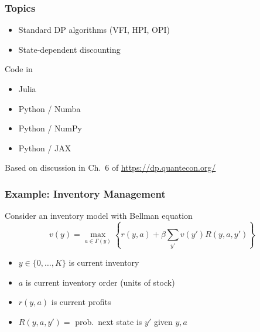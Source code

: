 \documentclass[xcolor=tex,dvipsnames]{beamer}
\subtitle{Lecture 1: Numerical Dynamic Programming}
\begin{document}
\begin{frame}
  \titlepage
\end{frame}


\begin{frame}
    \frametitle{Topics}

    \begin{itemize}
        \item Standard DP algorithms (VFI, HPI, OPI)
            \vspace{0.3em}
        \item State-dependent discounting
            \vspace{0.3em}
    \end{itemize}

    \vspace{0.3em}
    \vspace{0.3em}
    \vspace{0.3em}
    \vspace{0.3em}
    Code in 

    \begin{itemize}
        \item Julia
            \vspace{0.3em}
        \item Python / Numba
            \vspace{0.3em}
        \item Python / NumPy
            \vspace{0.3em}
        \item Python / JAX
    \end{itemize}

    Based on discussion in Ch.\ 6 of \url{https://dp.quantecon.org/}

\end{frame}



\begin{frame}
    \frametitle{Example: Inventory Management}

    Consider an inventory model  with Bellman equation
    \begin{equation*}
        v(y)
        = \max_{a \in \Gamma(y)} \left\{
            r(y, a)
            + \beta
            \sum_{y'} v(y') R(y, a, y')
        \right\}
    \end{equation*}
    \begin{itemize}
        \item $y \in \{0, \ldots, K\}$ is current inventory 
        \vspace{0.5em}
        \item $a$ is current inventory order (units of stock)
        \vspace{0.5em}
        \item $r(y, a)$ is current profits
        \vspace{0.5em}
        \item $R(y, a, y') =$ prob.\ next state is $y'$ given $y, a$
    \end{itemize}



\end{frame}
\end{document}
